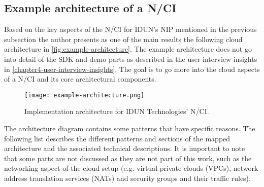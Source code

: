 \subsection{Example architecture of a N/CI}
\label{chapter5-example-architecture-of-a-nci}

Based on the key aspects of the N/CI for IDUN's NIP mentioned in the previous subsection the author presents as one of the main results the following cloud architecture in \autoref{fig:example-architecture}. The example architecture does not go into detail of the SDK and demo parts as described in the user interview insights in \autoref{chapter4-user-interview-insights}. The goal is to go more into the cloud aspects of a N/CI and its core architectural components.

\begin{figure}[!ht]
  \centering
  \texttt{[image: example-architecture.png]}
  \caption{Implementation architecture for IDUN Technologies' N/CI.}
  \label{fig:example-architecture}
\end{figure}

The architecture diagram contains some patterns that have specific reasons. The following list describes the different patterns and sections of the mapped architecture and the associated technical descriptions. It is important to note that some parts are not discussed as they are not part of this work, such as the networking aspect of the cloud setup (e.g. virtual private clouds (VPCs), network address translation services (NATs) and security groups and their traffic rules).

